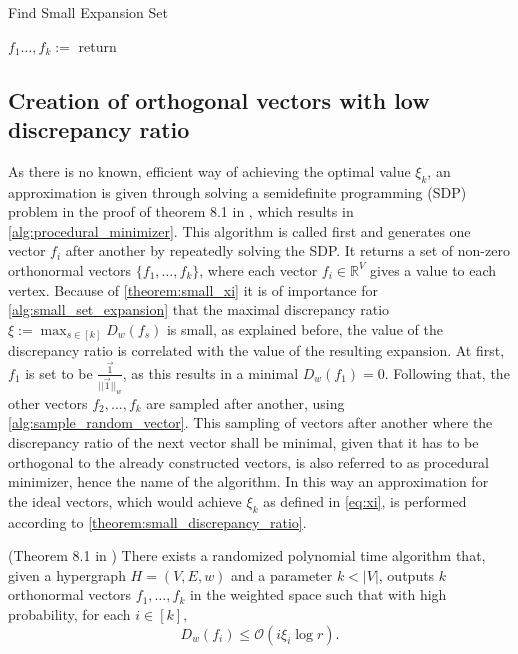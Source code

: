 \begin{algorithm}[htpb]
	\caption{Find Small Expansion Set \label{alg:ses}} 
	\begin{algorithmic}
		\State $f_1 \ldots, f_k := $
		\State return 
		\EndFunction 
	\end{algorithmic}
\end{algorithm}	

\subsection{Creation of orthogonal vectors with low discrepancy ratio}
As there is no known, efficient way of achieving the optimal value $\xi_k$, an approximation is given through solving a semidefinite programming (SDP) problem in the proof of theorem 8.1 in \cite{ChanLTZ16}, which results in \cref{alg:procedural_minimizer}. This algorithm is called first and generates one vector $f_i$ after another by repeatedly solving the SDP. 
It returns a set of non-zero orthonormal vectors $\{f_1, \ldots, f_k\}$, where each vector $f_i \in \mathbb{R}^V$ gives a value to each vertex. Because of \cref{theorem:small_xi} it is of importance for \cref{alg:small_set_expansion} that the maximal discrepancy ratio $\xi := \max_{s \in [k]} D_w(f_s)$ is small, as explained before, the value of the discrepancy ratio is correlated with the value of the resulting expansion.
At first, $f_1$ is set to be $\frac{\vec{1}}{||\vec{1}||_w}$, as this results in a minimal $D_w(f_1) =0$. Following that, the other vectors $f_2, \ldots, f_k$ are sampled after another, using \cref{alg:sample_random_vector}. This sampling of vectors after another where the discrepancy ratio of the next vector shall be minimal, given that it has to be orthogonal to the already constructed vectors, is also referred to as procedural minimizer, hence the name of the algorithm. In this way an approximation for the ideal vectors, which would achieve $\xi_k$ as defined in \cref{eq:xi}, is performed according to \cref{theorem:small_discrepancy_ratio}.

\begin{theorem}{(Theorem 8.1 in \cite{ChanLTZ16}) \label{theorem:small_discrepancy_ratio}}
	There exists a randomized polynomial time algorithm that, given a hypergraph $H = (V,E,w)$ and a parameter $ k < |V |$, outputs $k$ orthonormal vectors $f_1, \ldots , f_k$ in the weighted space such that with high probability, for each $i  \in [k],$
	\begin{equation}
	D_w(f_i) \le \mathcal{O} (i \xi_i \log r  ) .
	\end{equation}	
\end{theorem}

